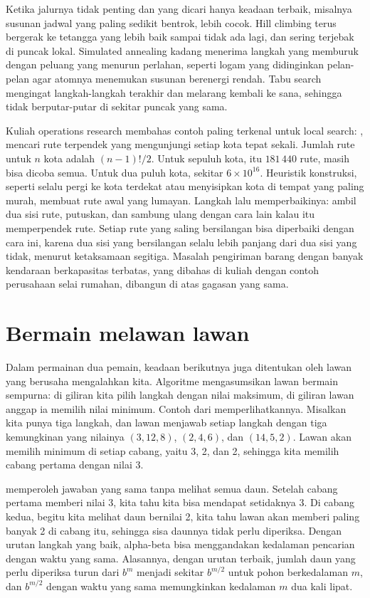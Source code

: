 Ketika jalurnya tidak penting dan yang dicari hanya keadaan terbaik, misalnya susunan jadwal yang
paling sedikit bentrok,  lebih cocok. Hill climbing terus bergerak ke tetangga
yang lebih baik sampai tidak ada lagi, dan sering terjebak di puncak lokal. Simulated annealing
\citep{kirkpatrick1983} kadang menerima langkah yang memburuk dengan peluang yang menurun perlahan,
seperti logam yang didinginkan pelan-pelan agar atomnya menemukan susunan berenergi rendah. Tabu
search \citep{glover1989} mengingat langkah-langkah terakhir dan melarang kembali ke sana, sehingga tidak berputar-putar di sekitar puncak yang sama.

Kuliah operations research membahas contoh paling terkenal untuk local search: ,
mencari rute terpendek yang mengunjungi setiap kota tepat sekali. Jumlah rute untuk $n$ kota adalah $(n-1)!/2$. Untuk
sepuluh kota, itu $181\,440$ rute, masih bisa dicoba semua. Untuk dua puluh kota, sekitar $6\times10^{16}$. Heuristik
konstruksi, seperti selalu pergi ke kota terdekat atau menyisipkan kota di tempat yang paling murah, membuat rute awal
yang lumayan. Langkah  lalu memperbaikinya: ambil dua sisi rute, putuskan, dan sambung ulang dengan cara
lain kalau itu memperpendek rute. Setiap rute yang saling bersilangan bisa diperbaiki dengan cara ini, karena dua sisi
yang bersilangan selalu lebih panjang dari dua sisi yang tidak, menurut ketaksamaan segitiga. Masalah pengiriman barang
dengan banyak kendaraan berkapasitas terbatas, yang dibahas di kuliah dengan contoh perusahaan selai rumahan, dibangun
di atas gagasan yang sama.

\section{Bermain melawan lawan}

Dalam permainan dua pemain, keadaan berikutnya juga ditentukan oleh lawan yang berusaha
mengalahkan kita. Algoritme  mengasumsikan lawan bermain sempurna: di giliran kita
pilih langkah dengan nilai maksimum, di giliran lawan anggap ia memilih nilai minimum. Contoh dari
\citet{russell2021} memperlihatkannya. Misalkan kita punya tiga langkah, dan lawan menjawab setiap
langkah dengan tiga kemungkinan yang nilainya $(3,12,8)$, $(2,4,6)$, dan $(14,5,2)$. Lawan akan
memilih minimum di setiap cabang, yaitu 3, 2, dan 2, sehingga kita memilih cabang pertama dengan
nilai 3.

 \citep{knuth1975} memperoleh jawaban yang sama tanpa melihat semua daun.
Setelah cabang pertama memberi nilai 3, kita tahu kita bisa mendapat setidaknya 3. Di cabang kedua,
begitu kita melihat daun bernilai 2, kita tahu lawan akan memberi paling banyak 2 di cabang itu,
sehingga sisa daunnya tidak perlu diperiksa. Dengan urutan langkah yang baik, alpha-beta bisa
menggandakan kedalaman pencarian dengan waktu yang sama. Alasannya, dengan urutan terbaik, jumlah daun yang perlu
diperiksa turun dari $b^m$ menjadi sekitar $b^{m/2}$ untuk pohon berkedalaman $m$, dan $b^{m/2}$ dengan waktu yang sama
memungkinkan kedalaman $m$ dua kali lipat.

